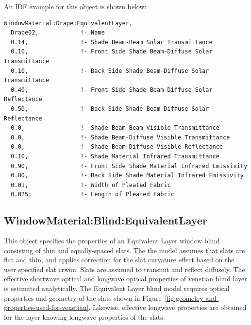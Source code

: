 An IDF example for this object is shown below:

\begin{lstlisting}
WindowMaterial:Drape:EquivalentLayer,
  Drape02,            !- Name
  0.14,               !- Shade Beam-Beam Solar Transmittance
  0.10,               !- Front Side Shade Beam-Diffuse Solar Transmittance
  0.10,               !- Back Side Shade Beam-Diffuse Solar Transmittance
  0.40,               !- Front Side Shade Beam-Diffuse Solar Reflectance
  0.50,               !- Back Side Shade Beam-Diffuse Solar Reflectance
  0.0,                !- Shade Beam-Beam Visible Transmittance
  0.0,                !- Shade Beam-Diffuse Visible Transmittance
  0.0,                !- Shade Beam-Diffuse Visible Reflectance
  0.10,               !- Shade Material Infrared Transmittance
  0.90,               !- Front Side Shade Material Infrared Emissivity
  0.80,               !- Back Side Shade Material Infrared Emissivity
  0.01,               !- Width of Pleated Fabric
  0.025;              !- Length of Pleated Fabric
\end{lstlisting}

\subsection{WindowMaterial:Blind:EquivalentLayer}\label{windowmaterialblindequivalentlayer}

This object specifies the properties of an Equivalent Layer window blind consisting of thin and equally-spaced slats. The the model assumes that slats are flat and thin, and applies correction for the slat curvature effect based on the user specified slat crwon. Slats are assumed to transmit and reflect diffusely. The effective shortwave optical and longwave optical properties of venetian blind layer is estimated analytically. The Equivalent Layer blind model requires optical properties and geometry of the slats shown in Figure~\ref{fig:geometry-and-properties-used-for-venetian}. Likewise, effective longwave properties are obtained for the layer knowing longwave properties of the slats.

